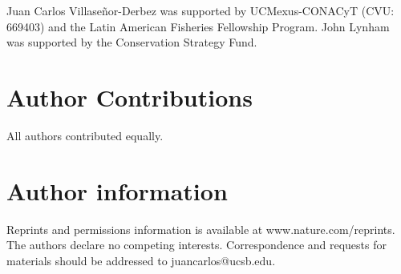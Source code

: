 \documentclass[12pt]{article}
\begin{document}
Juan Carlos Villaseñor-Derbez was supported by UCMexus-CONACyT (CVU: 669403) and the Latin American Fisheries Fellowship Program. John Lynham was supported by the Conservation Strategy Fund.

\section{Author Contributions}

All authors contributed equally.

\section{Author information}

Reprints and permissions information is available at www.nature.com/reprints. The authors declare no competing interests. Correspondence and requests for materials should be addressed to juancarlos@ucsb.edu.

\clearpage

\FloatBarrier
\end{document}
